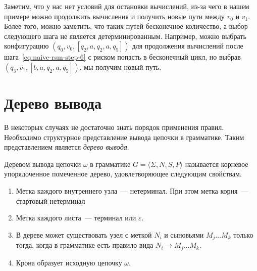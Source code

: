 \begin{example}
Заметим, что у нас нет условий для остановки вычислений, из-за чего в нашем примере можно продолжить вычисления и получить новые пути между $v_0$ и $v_1$.
Более того, можно заметить, что таких путей бесконечное количество, а выбор следующего шага не является детерминированным.
Например, можно выбрать конфигурацию $(q_0,v_0,[q_2,a,q_2,a,q_5])$ для продолжения вычислений после шага~\ref{eq:naive-rsm-step-6} с риском попасть в бесконечный цикл, но выбрав $(q_3,v_1,[b,a,q_2,a,q_5])$, мы получим новый путь.

\end{example}

\section{Дерево вывода}
\label{sect:DerivTree}

В некоторых случаях не достаточно знать порядок применения правил.
Необходимо структурное представление вывода цепочки в грамматике.
Таким представлением является \emph{дерево вывода}.

\begin{definition}
    Деревом вывода цепочки $\omega$ в грамматике $G = \langle \Sigma, N, S, P \rangle$ называется корневое упорядоченное помеченное дерево, удовлетворяющее следующим свойствам.
    \begin{enumerate}
        \item Метка каждого внутреннего узла~--- нетерминал. При этом метка корня~--- стартовый нетерминал
        \item Метка каждого листа~--- терминал или $\varepsilon$.
        \item В дереве может существовать узел с меткой $N_i$ и сыновьями $M_j \dots M_k$ только тогда, когда в грамматике есть правило вида $N_i \to M_j \dots M_k$.
        \item Крона образует исходную цепочку $\omega$.
    \end{enumerate}
\end{definition}

